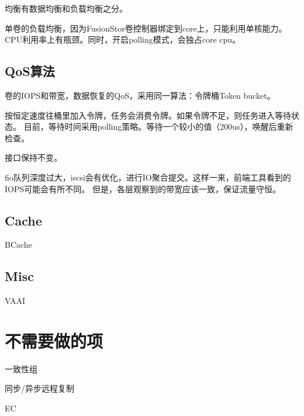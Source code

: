 均衡有数据均衡和负载均衡之分。

单卷的负载均衡，因为FusionStor卷控制器绑定到core上，只能利用单核能力。
CPU利用率上有瓶颈。同时，开启polling模式，会独占core cpu。

\subsection{QoS算法}

卷的IOPS和带宽，数据恢复的QoS，采用同一算法：令牌桶Token bucket。

按恒定速度往桶里加入令牌，任务会消费令牌。如果令牌不足，则任务进入等待状态。
目前，等待时间采用polling策略。等待一个较小的值（200us），唤醒后重新检查。

接口保持不变。

\begin{tcolorbox}
fio队列深度过大，iscsi会有优化，进行IO聚合提交。这样一来，前端工具看到的IOPS可能会有所不同。
但是，各层观察到的带宽应该一致，保证流量守恒。
\end{tcolorbox}

\subsection{Cache}

BCache

\subsection{Misc}

VAAI

\section{不需要做的项}

\begin{enumbox}
\item 一致性组
\item 同步/异步远程复制
\item EC
\end{enumbox}
